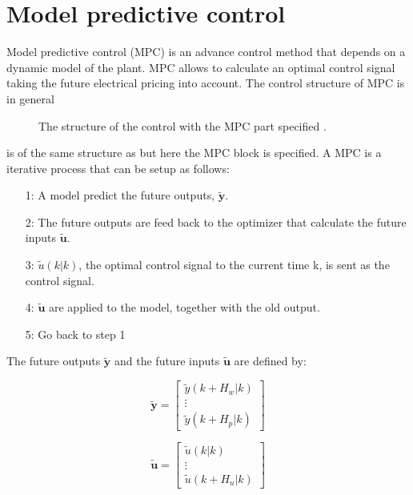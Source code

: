 \section{Model predictive control}

Model predictive control (MPC) is an advance control method that depends on a dynamic model of the plant. MPC allows to calculate an optimal control signal taking the future electrical pricing into account. The control structure of MPC is in general 

\begin{figure}[H]
\centering
 
\caption{The structure of the control with the MPC part specified \cite{Camacho2007}.}
\label{mpc_structure}
\end{figure}

 is of the same structure as  but here the MPC block is specified. A MPC is a iterative process that can be setup as follows: 

\begin{itemize}
\item[1:] A model predict the future outputs, $\pmb{\tilde y}$.
\item[2:] The future outputs are feed back to the optimizer that calculate the future inputs $\pmb{\tilde u}$.
\item[3:] $\tilde u(k|k)$, the optimal control signal to the current time k, is sent as the control signal.
\item[4:] $\pmb{\tilde u}$ are applied to the model, together with the old output.
\item[5:] Go back to step 1 
\end{itemize}

The future outputs $\pmb{\tilde y}$ and the future inputs $\pmb{\tilde u}$ are defined by:

\begin{equation}
\pmb{\tilde y} =  
 \begin{bmatrix}
  \tilde y(k+H_w|k)\\
  \vdots  \\
  \tilde y(k+H_p|k)   
 \end{bmatrix}
\end{equation}

\begin{equation}
\pmb{\tilde u} =  
 \begin{bmatrix}
  \tilde u(k|k)\\
  \vdots  \\
  \tilde u(k+H_u|k)   
 \end{bmatrix}
\end{equation}

